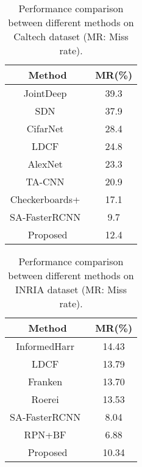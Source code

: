 \documentclass[journal]{IEEEtran}
\begin{document}
\begin{table}[t]
\caption{Performance comparison between different methods on Caltech dataset (MR: Miss rate). }
\begin{center}
\begin{tabular}[c]{|c|c|}
\hline
\bf{Method} & MR(\%)  \\
\hline
JointDeep~\cite{ouyang2013joint} & 39.3 \\
\hline
SDN~\cite{luo2014switchable} & 37.9 \\
\hline
CifarNet~\cite{hosang2015taking} & 28.4 \\
\hline
LDCF~\cite{nam2014local} & 24.8 \\
\hline
AlexNet~\cite{hosang2015taking} & 23.3 \\
\hline
TA-CNN~\cite{tian2015pedestrian} &  20.9 \\
\hline
Checkerboards+~\cite{zhang2015filtered} & 17.1 \\
\hline
SA-FasterRCNN~\cite{li2018scale} & 9.7 \\
\hline
Proposed & 12.4 \\
\hline
\end{tabular}
\end{center}
\label{table:result2}
\end{table}

\begin{table}[t]
\caption{Performance comparison between different methods on INRIA dataset (MR: Miss rate). }
\begin{center}
\begin{tabular}[c]{|c|c|}
\hline
\bf{Method} & MR(\%)  \\
\hline
InformedHarr~\cite{zhang2014informed} & 14.43 \\
\hline
LDCF~\cite{nam2014local} & 13.79 \\
\hline
Franken~\cite{mathias2013handling} & 13.70 \\
\hline
Roerei~\cite{benenson2013seeking} & 13.53 \\
\hline
SA-FasterRCNN~\cite{li2018scale} & 8.04 \\
\hline
RPN+BF~\cite{zhang2016faster} & 6.88 \\
\hline
Proposed & 10.34 \\
\hline

\hline
\end{tabular}
\end{center}
\label{table:result3}
\end{table}
\end{document}

